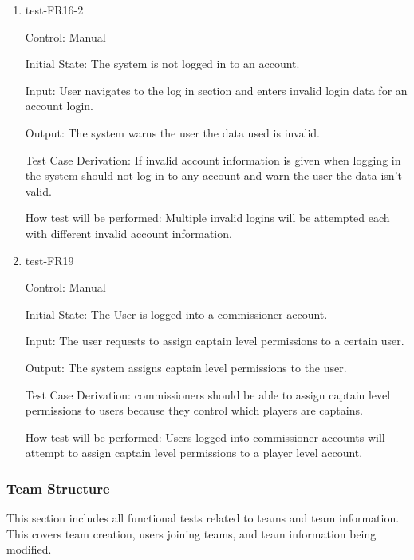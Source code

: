 \documentclass[12pt, titlepage]{article}
\begin{document}
\begin{enumerate}
  \item{test-FR16-2\\}

  Control: Manual

  Initial State: The system is not logged in to an account.

  Input: User navigates to the log in section and enters invalid login data
  for an account login.

  Output: The system warns the user the data used is invalid.

  Test Case Derivation: If invalid account information is given when logging
  in the system should not log in to any account and warn the user the data
  isn't valid.

  How test will be performed: Multiple invalid logins will be attempted each
  with different invalid account information.

  \item{test-FR19\\}

  Control: Manual

  Initial State: The User is logged into a commissioner account.

  Input: The user requests to assign captain level permissions to a 
  certain user.

  Output: The system assigns captain level permissions to the user.

  Test Case Derivation: commissioners should be able to assign captain level
  permissions to users because they control which players are captains.

  How test will be performed: Users logged into commissioner accounts will attempt
  to assign captain level permissions to a player level account.

\end{enumerate}

\subsubsection{Team Structure}

This section includes all functional tests related to teams and team
information. This covers team creation, users joining teams, and team
information being modified.
\end{document}
